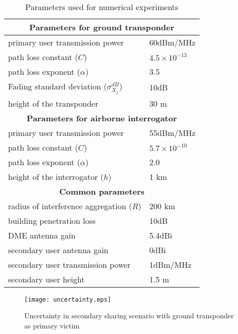\documentclass[12pt,submission,journal,onecolumn]{IEEEtran}
\begin{document}
\begin{table}[ht]
\renewcommand{\arraystretch}{1.1}
\centering
\caption{Parameters used for numerical experiments}\label{tab:param}
  \begin{tabular}{l|l}
    \hline\hline
    \multicolumn{2}{c}{\textbf{Parameters for ground transponder}}\\
    \hline
    primary user transmission power & 60dBm/MHz\\
    \hline
    path loss constant ($C$) & $4.5 \times 10^{-13}$\\
    \hline
    path loss exponent ($\alpha$) & 3.5\\
    \hline
    Fading standard deviation ($\sigma_{X_j}^{dB}$) & 10dB\\
    \hline
    height of the transponder & 30 m\\
    \hline\hline
    \multicolumn{2}{c}{\textbf{Parameters for airborne interrogator}}\\
    \hline
    primary user transmission power & 55dBm/MHz\\
    \hline
    path loss constant ($C$) & $5.7 \times 10^{-10}$\\
    \hline
    path loss exponent ($\alpha$) & 2.0\\
    \hline
    height of the interrogator ($h$) & 1 km\\
    \hline\hline
    \multicolumn{2}{c}{\textbf{Common parameters}}\\
    \hline
    radius of interference aggregation ($R$) & 200 km\\
    \hline
    building penetration loss & 10dB\\
    \hline
    DME antenna gain & 5.4dBi\\
    \hline
    secondary user antenna gain & 0dBi\\
    \hline
    secondary user transmission power & 1dBm/MHz\\
    \hline
    secondary user height & 1.5 m\\
    \hline
  \end{tabular}
\end{table}

\begin{figure}[ht]
  \centering \texttt{[image: uncertainty.eps]}\\
  \centering \caption{Uncertainty in secondary sharing scenario with ground transponder as primary victim}
  \label{fig:GroundScenario}
\end{figure}
\end{document}
